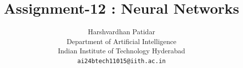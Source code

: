 \documentclass{article}
\title{Assignment-12 : Neural Networks}
\author{Harshvardhan Patidar\\
  Department of Artificial Intelligence\\
  Indian Institute of Technology Hyderabad\\
  \texttt{ai24btech11015@iith.ac.in}
}
\begin{document}
\



\maketitle






















\end{document}
